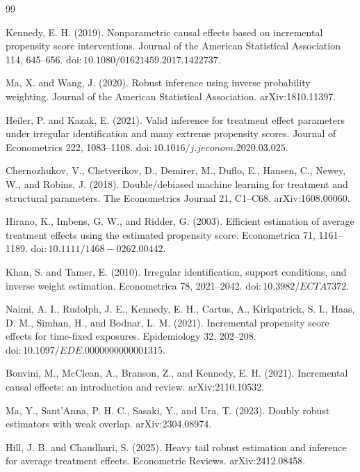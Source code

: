 \documentclass{article}
\begin{document}
\begin{thebibliography}{99}

   Kennedy, E. H. (2019). Nonparametric causal effects based on incremental propensity score interventions. Journal of the American Statistical Association 114, 645--656. \(\mathrm{doi}:10.1080/01621459.2017.1422737\).

   Ma, X. and Wang, J. (2020). Robust inference using inverse probability weighting. Journal of the American Statistical Association. arXiv:1810.11397.

   Heiler, P. and Kazak, E. (2021). Valid inference for treatment effect parameters under irregular identification and many extreme propensity scores. Journal of Econometrics 222, 1083--1108. \(\mathrm{doi}:10.1016/j.jeconom.2020.03.025\).

   Chernozhukov, V., Chetverikov, D., Demirer, M., Duflo, E., Hansen, C., Newey, W., and Robins, J. (2018). Double/debiased machine learning for treatment and structural parameters. The Econometrics Journal 21, C1--C68. arXiv:1608.00060.

   Hirano, K., Imbens, G. W., and Ridder, G. (2003). Efficient estimation of average treatment effects using the estimated propensity score. Econometrica 71, 1161--1189. \(\mathrm{doi}:10.1111/1468-0262.00442\).

   Khan, S. and Tamer, E. (2010). Irregular identification, support conditions, and inverse weight estimation. Econometrica 78, 2021--2042. \(\mathrm{doi}:10.3982/ECTA7372\).

   Naimi, A. I., Rudolph, J. E., Kennedy, E. H., Cartus, A., Kirkpatrick, S. I., Haas, D. M., Simhan, H., and Bodnar, L. M. (2021). Incremental propensity score effects for time-fixed exposures. Epidemiology 32, 202--208. \(\mathrm{doi}:10.1097/EDE.0000000000001315\).

   Bonvini, M., McClean, A., Branson, Z., and Kennedy, E. H. (2021). Incremental causal effects: an introduction and review. arXiv:2110.10532.

   Ma, Y., Sant'Anna, P. H. C., Sasaki, Y., and Ura, T. (2023). Doubly robust estimators with weak overlap. arXiv:2304.08974.

   Hill, J. B. and Chaudhuri, S. (2025). Heavy tail robust estimation and inference for average treatment effects. Econometric Reviews. arXiv:2412.08458.


\end{thebibliography}
\end{document}
